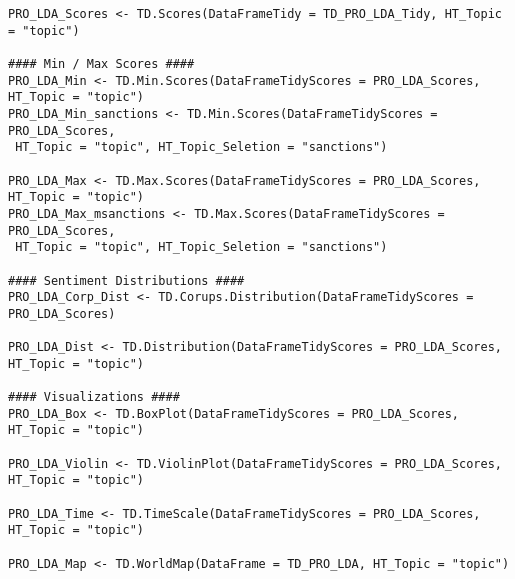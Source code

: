 \begin{lstlisting}
PRO_LDA_Scores <- TD.Scores(DataFrameTidy = TD_PRO_LDA_Tidy, HT_Topic = "topic")

#### Min / Max Scores #### 
PRO_LDA_Min <- TD.Min.Scores(DataFrameTidyScores = PRO_LDA_Scores, HT_Topic = "topic")
PRO_LDA_Min_sanctions <- TD.Min.Scores(DataFrameTidyScores = PRO_LDA_Scores, 
 HT_Topic = "topic", HT_Topic_Seletion = "sanctions")

PRO_LDA_Max <- TD.Max.Scores(DataFrameTidyScores = PRO_LDA_Scores, HT_Topic = "topic")
PRO_LDA_Max_msanctions <- TD.Max.Scores(DataFrameTidyScores = PRO_LDA_Scores, 
 HT_Topic = "topic", HT_Topic_Seletion = "sanctions")

#### Sentiment Distributions ####
PRO_LDA_Corp_Dist <- TD.Corups.Distribution(DataFrameTidyScores = PRO_LDA_Scores)

PRO_LDA_Dist <- TD.Distribution(DataFrameTidyScores = PRO_LDA_Scores, HT_Topic = "topic")

#### Visualizations ####
PRO_LDA_Box <- TD.BoxPlot(DataFrameTidyScores = PRO_LDA_Scores, HT_Topic = "topic")

PRO_LDA_Violin <- TD.ViolinPlot(DataFrameTidyScores = PRO_LDA_Scores, HT_Topic = "topic")

PRO_LDA_Time <- TD.TimeScale(DataFrameTidyScores = PRO_LDA_Scores, HT_Topic = "topic")

PRO_LDA_Map <- TD.WorldMap(DataFrame = TD_PRO_LDA, HT_Topic = "topic")

\end{lstlisting}